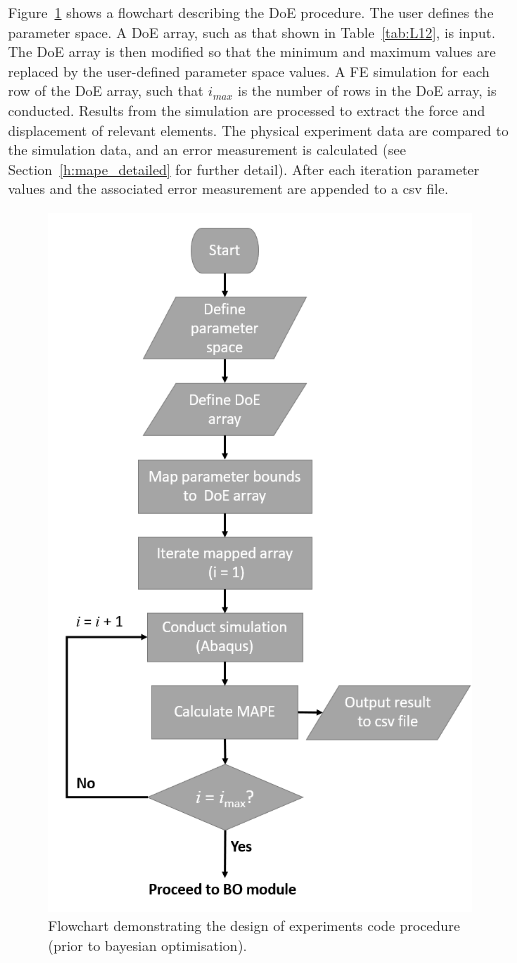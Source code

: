 \documentclass[preprint, review, 12pt]{elsarticle}
\begin{document}
	

	Figure~\ref{fig:doe_flowchart} shows a flowchart describing the DoE procedure.
	The user defines the parameter space.
	A DoE array, such as that shown in Table~\ref{tab:L12}, is input.
	The DoE array is then modified so that the minimum and maximum values are replaced by the user-defined parameter space values.
	A FE simulation for each row of the DoE array, such that $i_{max}$ is the number of rows in the DoE array, is conducted.
	Results from the simulation are processed to extract the force and displacement of relevant elements.
	The physical experiment data are compared to the simulation data, and an error measurement is calculated (see Section~\ref{h:mape_detailed} for further detail).
	After each iteration parameter values and the associated error measurement are appended to a csv file.

	\begin{figure}[!htbp]
		\centering
		\includegraphics[width=\linewidth, height=0.8\textheight, keepaspectratio]{DOE_FLOWCHART}
		\caption{Flowchart demonstrating the design of experiments code procedure (prior to bayesian optimisation).}
		\label{fig:doe_flowchart}
	\end{figure}
\end{document}
